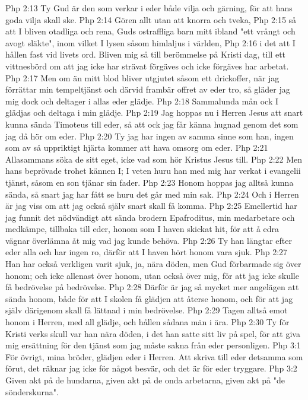 Php 2:13  Ty Gud är den som verkar i eder både vilja och gärning, för att hans goda vilja skall ske.
Php 2:14  Gören allt utan att knorra och tveka,
Php 2:15  så att I bliven otadliga och rena, Guds ostraffliga barn mitt ibland "ett vrångt och avogt släkte", inom vilket I lysen såsom himlaljus i världen,
Php 2:16  i det att I hållen fast vid livets ord. Bliven mig så till berömmelse på Kristi dag, till ett vittnesbörd om att jag icke har strävat förgäves och icke förgäves har arbetat.
Php 2:17  Men om än mitt blod bliver utgjutet såsom ett drickoffer, när jag förrättar min tempeltjänst och därvid frambär offret av eder tro, så gläder jag mig dock och deltager i allas eder glädje.
Php 2:18  Sammalunda mån ock I glädjas och deltaga i min glädje.
Php 2:19  Jag hoppas nu i Herren Jesus att snart kunna sända Timoteus till eder, så att ock jag får känna hugnad genom det som jag då hör om eder.
Php 2:20  Ty jag har ingen av samma sinne som han, ingen som av så uppriktigt hjärta kommer att hava omsorg om eder.
Php 2:21  Allasammans söka de sitt eget, icke vad som hör Kristus Jesus till.
Php 2:22  Men hans beprövade trohet kännen I; I veten huru han med mig har verkat i evangelii tjänst, såsom en son tjänar sin fader.
Php 2:23  Honom hoppas jag alltså kunna sända, så snart jag har fått se huru det går med min sak.
Php 2:24  Och i Herren är jag viss om att jag också själv snart skall få komma.
Php 2:25  Emellertid har jag funnit det nödvändigt att sända brodern Epafroditus, min medarbetare och medkämpe, tillbaka till eder, honom som I haven skickat hit, för att å edra vägnar överlämna åt mig vad jag kunde behöva.
Php 2:26  Ty han längtar efter eder alla och har ingen ro, därför att I haven hört honom vara sjuk.
Php 2:27  Han har också verkligen varit sjuk, ja, nära döden, men Gud förbarmade sig över honom; och icke allenast över honom, utan också över mig, för att jag icke skulle få bedrövelse på bedrövelse.
Php 2:28  Därför är jag så mycket mer angelägen att sända honom, både för att I skolen få glädjen att återse honom, och för att jag själv därigenom skall få lättnad i min bedrövelse.
Php 2:29  Tagen alltså emot honom i Herren, med all glädje, och hållen sådana män i ära.
Php 2:30  Ty för Kristi verks skull var han nära döden, i det han satte sitt liv på spel, för att giva mig ersättning för den tjänst som jag måste sakna från eder personligen.
Php 3:1  För övrigt, mina bröder, glädjen eder i Herren. Att skriva till eder detsamma som förut, det räknar jag icke för något besvär, och det är för eder tryggare.
Php 3:2  Given akt på de hundarna, given akt på de onda arbetarna, given akt på "de sönderskurna".
